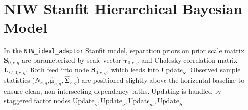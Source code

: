 \documentclass[11pt]{report}
\begin{document}
\newpage
\section{NIW Stanfit Hierarchical Bayesian Model}

In the \texttt{NIW\_ideal\_adaptor} Stanfit model, separation priors on prior scale matrix $\mathbf{S}_{0,c,g}$ are parameterized by scale vector $\boldsymbol{\tau}_{0,c,g}$ and Cholesky correlation matrix $\mathbf{L}_{\Omega,0,c,g}$. Both feed into node $\mathbf{S}_{0,c,g}$, which feeds into $\text{Update}_S$. Observed sample statistics ($N_{c,g}, \mathbf{\hat{\mu}}_{c,g}, \mathbf{\hat{\Sigma}}_{c,g}$) are positioned slightly above the horizontal baseline to ensure clean, non-intersecting dependency paths. Updating is handled by staggered factor nodes $\text{Update}_\kappa, \text{Update}_\nu, \text{Update}_m, \text{Update}_S$.
\end{document}

